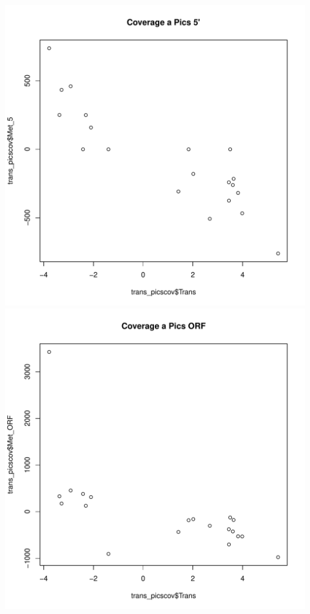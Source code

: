 \documentclass{article}\usepackage[]{graphicx}\usepackage[]{color}
\makeatletter
\def\maxwidth{ %
  \ifdim\Gin@nat@width>\linewidth
    \linewidth
  \else
    \Gin@nat@width
  \fi
}
\newenvironment{knitrout}{}{} %
\makeatother
\begin{document}
\begin{knitrout}
{\includegraphics[width=\maxwidth]{figure/minimal-correlacions_trans-7} 
\includegraphics[width=\maxwidth]{figure/minimal-correlacions_trans-8} 
}
\end{knitrout}
\end{document}
